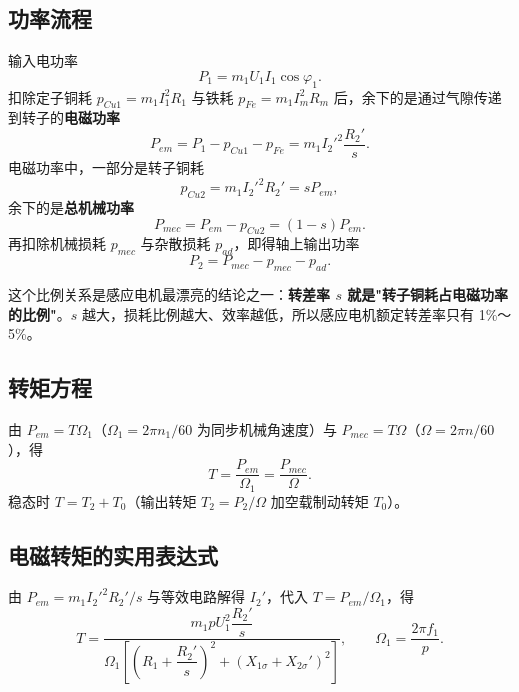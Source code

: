 \subsection{功率流程}
输入电功率
\begin{equation}
P_1=m_1U_1I_1\cos\varphi_1 .
\end{equation}
扣除定子铜耗 $p_{Cu1}=m_1I_1^2R_1$ 与铁耗 $p_{Fe}=m_1I_m^2R_m$ 后，余下的是通过气隙传递到转子的\textbf{电磁功率}
\begin{equation}
P_{em}=P_1-p_{Cu1}-p_{Fe}=m_1I_2'^{2}\frac{R_2'}{s} .
\end{equation}
电磁功率中，一部分是转子铜耗
\begin{equation}
p_{Cu2}=m_1I_2'^{2}R_2'=sP_{em},
\end{equation}
余下的是\textbf{总机械功率}
\begin{equation}
P_{mec}=P_{em}-p_{Cu2}=\left(1-s\right)P_{em} .
\end{equation}
再扣除机械损耗 $p_{mec}$ 与杂散损耗 $p_{ad}$，即得轴上输出功率
\begin{equation}
P_2=P_{mec}-p_{mec}-p_{ad} .
\end{equation}


这个比例关系是感应电机最漂亮的结论之一：\textbf{转差率 $s$ 就是"转子铜耗占电磁功率的比例"}。$s$ 越大，损耗比例越大、效率越低，所以感应电机额定转差率只有 1\%～5\%。

\subsection{转矩方程}
由 $P_{em}=T\Omega_1$（$\Omega_1=2\pi n_1/60$ 为同步机械角速度）与 $P_{mec}=T\Omega$（$\Omega=2\pi n/60$），得
\begin{equation}
T=\frac{P_{em}}{\Omega_1}=\frac{P_{mec}}{\Omega}.
\end{equation}
稳态时 $T=T_2+T_0$（输出转矩 $T_2=P_2/\Omega$ 加空载制动转矩 $T_0$）。

\subsection{电磁转矩的实用表达式}
由 $P_{em}=m_1I_2'^2R_2'/s$ 与等效电路解得 $I_2'$，代入 $T=P_{em}/\Omega_1$，得
\begin{equation}
T=\frac{m_1pU_1^{2}\dfrac{R_2'}{s}}{\Omega_1\left[\left(R_1+\dfrac{R_2'}{s}\right)^{2}+\left(X_{1\sigma}+X_{2\sigma}'\right)^{2}\right]},
\qquad \Omega_1=\frac{2\pi f_1}{p}.
\end{equation}

